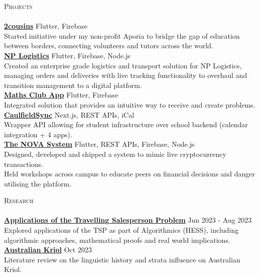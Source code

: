\documentclass[a4paper]{article}
\newcommand{\lineunder} {
    \vspace*{-8pt} \\
    \hspace*{-18pt} \hrulefill \\
}
\newcommand{\header} [1] {
    {\hspace*{-18pt}\vspace*{6pt} \textsc{#1}}
    \vspace*{-6pt} \lineunder
}
\begin{document}
\header{Projects}
{\href{https://2cousins.org/}{\textbf{2cousins}}} {\textsl{\hfill} Flutter, Firebase}\\
Started initiative under my non-profit Aporia to bridge the gap of education between borders, connecting volunteers and tutors across the world.\\
\vspace*{2mm}
{\href{https://nplogistics.com.au}{\textbf{NP Logistics}}} {\textsl{\hfill} Flutter, Firebase, Node.js}\\
Created an enterprise grade logistics and transport solution for NP Logistics, managing orders and deliveries with live tracking functionality to overhaul and transition management to a digital platform.\\
\vspace*{2mm}
{\href{https://github.com/cgs-math/app}{\textbf{Maths Club App}}} {\textsl{\hfill} Flutter, Firebase}\\
Integrated solution that provides an intuitive way to receive and create problems.\\
\vspace*{2mm}
{\href{https://caulfieldsync.vercel.app/}{\textbf{CaulfieldSync}}} {\textsl{\hfill} Next.js, REST APIs, iCal}\\
Wrapper API allowing for student infrastructure over school backend (calendar integration + 4 apps).\\
\vspace*{2mm}
{\href{https://the-nova-system.github.io/}{\textbf{The NOVA System}}} {\textsl{\hfill} Flutter, REST APIs, Firebase, Node.js}\\
Designed, developed and shipped a system to mimic live cryptocurrency transactions.\\
Held workshops across campus to educate peers on financial decisions and danger utilising the platform.\\
\vspace*{2mm}

\header{Research}
\href{https://garv-shah.github.io/applications_of_tsp.pdf}{\textbf{Applications of the Travelling Salesperson Problem}} \hfill Jun 2023 - Aug 2023\\
Explored applications of the TSP as part of Algorithmics (HESS), including algorithmic approaches, mathematical proofs and real world implications. \\
\vspace*{2mm}
\href{https://garv-shah.github.io/australian_kriol.pdf}{\textbf{Australian Kriol}} \hfill Oct 2023\\
Literature review on the linguistic history and strata influence on Australian Kriol.\\
\vspace*{2mm}
\end{document}
